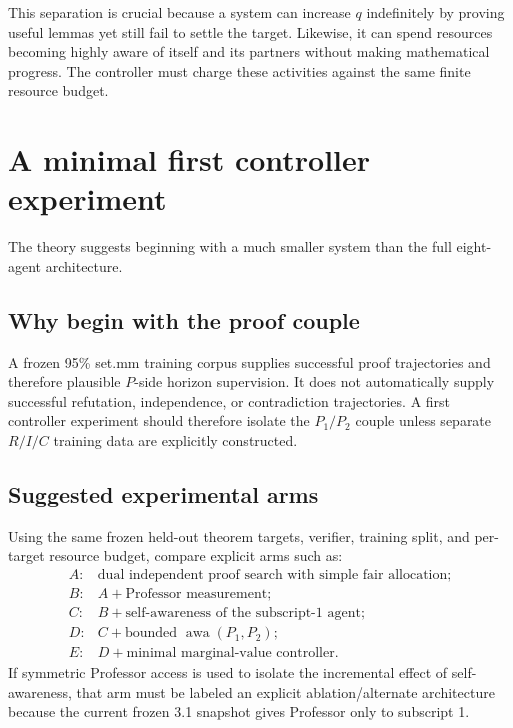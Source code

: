 \documentclass[11pt]{article}
\theoremstyle{definition}
\theoremstyle{remark}
\newcommand{\awa}{\operatorname{awa}}
\begin{document}
This separation is crucial because a system can increase $q$ indefinitely by proving useful lemmas yet still fail to settle the target. Likewise, it can spend resources becoming highly aware of itself and its partners without making mathematical progress. The controller must charge these activities against the same finite resource budget.

\section{A minimal first controller experiment}

The theory suggests beginning with a much smaller system than the full eight-agent architecture.

\subsection{Why begin with the proof couple}

A frozen 95\% set.mm training corpus supplies successful proof trajectories and therefore plausible $P$-side horizon supervision. It does not automatically supply successful refutation, independence, or contradiction trajectories. A first controller experiment should therefore isolate the $P_1/P_2$ couple unless separate $R/I/C$ training data are explicitly constructed.

\subsection{Suggested experimental arms}

Using the same frozen held-out theorem targets, verifier, training split, and per-target resource budget, compare explicit arms such as:
\[
\begin{array}{ll}
A:&\text{dual independent proof search with simple fair allocation};\\
B:&A+\text{Professor measurement};\\
C:&B+\text{self-awareness of the subscript-1 agent};\\
D:&C+\text{bounded }\awa(P_1,P_2);\\
E:&D+\text{minimal marginal-value controller}.
\end{array}
\]
If symmetric Professor access is used to isolate the incremental effect of self-awareness, that arm must be labeled an explicit ablation/alternate architecture because the current frozen 3.1 snapshot gives Professor only to subscript 1.
\end{document}
